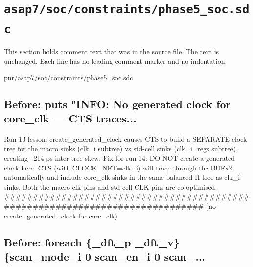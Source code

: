 \section{\texttt{asap7/soc/constraints/phase5\_soc.sdc}}\label{tm:pd:asap7-soc-phase5-sdc}

This section holds comment text that was in the source file. The text is unchanged. Each line has no leading comment marker and no indentation.

\begin{relocated}{pnr/asap7/soc/constraints/phase5_soc.sdc}

\subsection*{Before: puts "INFO: No generated clock for core\_clk — CTS traces...}

\begin{textblock}
   Run-13 lesson: create_generated_clock causes CTS to build a SEPARATE
   clock tree for the macro sinks (clk_i subtree) vs std-cell sinks
   (clk_i_regs subtree), creating ~214 ps inter-tree skew.
   Fix for run-14: DO NOT create a generated clock here.
   CTS (with CLOCK_NET=clk_i) will trace through the BUFx2 automatically
   and include core_clk sinks in the same balanced H-tree as clk_i sinks.
   Both the macro clk pins and std-cell CLK pins are co-optimised.
##############################################################################
(no create_generated_clock for core_clk)
\end{textblock}

\subsection*{Before: foreach \{\_dft\_p \_dft\_v\} \{scan\_mode\_i 0 scan\_en\_i 0 scan\_...}



\end{relocated}
